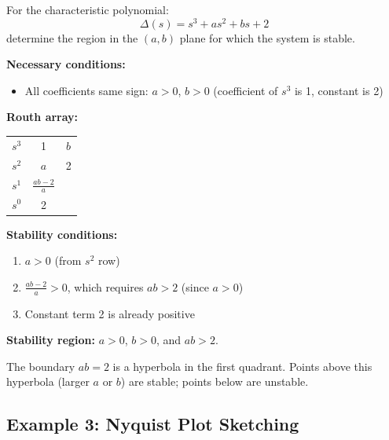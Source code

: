 \begin{example}
\label{ex:two_parameter}
For the characteristic polynomial:
\begin{equation}
\Delta(s) = s^3 + as^2 + bs + 2
\end{equation}
determine the region in the $(a, b)$ plane for which the system is stable.

\textbf{Necessary conditions:}
\begin{itemize}
    \item All coefficients same sign: $a > 0$, $b > 0$ (coefficient of $s^3$ is 1, constant is 2)
\end{itemize}

\textbf{Routh array:}
\begin{center}
\begin{tabular}{c|cc}
$s^3$ & 1 & $b$ \\
$s^2$ & $a$ & 2 \\
$s^1$ & $\frac{ab - 2}{a}$ & \\
$s^0$ & 2 &
\end{tabular}
\end{center}

\textbf{Stability conditions:}
\begin{enumerate}
    \item $a > 0$ (from $s^2$ row)
    \item $\frac{ab - 2}{a} > 0$, which requires $ab > 2$ (since $a > 0$)
    \item Constant term 2 is already positive
\end{enumerate}

\textbf{Stability region:} $a > 0$, $b > 0$, and $ab > 2$.

The boundary $ab = 2$ is a hyperbola in the first quadrant. Points above this hyperbola (larger $a$ or $b$) are stable; points below are unstable.
\end{example}

\subsection{Example 3: Nyquist Plot Sketching}


